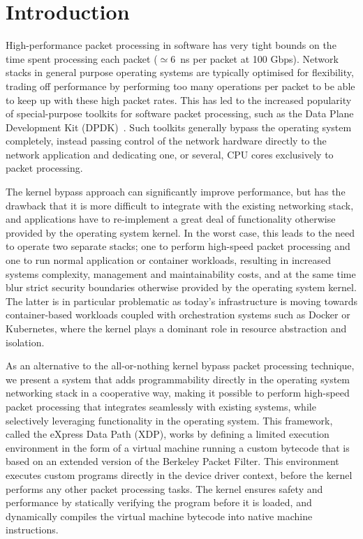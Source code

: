 \documentclass[10pt,sigconf,anonymous]{acmart}
\begin{document}

\maketitle

\section{Introduction}%
\label{sec:introduction}
High-performance packet processing in software has very tight bounds on the time
spent processing each packet ($\simeq6$~ns per packet at 100 Gbps). Network
stacks in general purpose operating systems are typically optimised for
flexibility, trading off performance by performing too many operations per
packet to be able to keep up with these high packet rates. This has led to the
increased popularity of special-purpose toolkits for software packet processing,
such as the Data Plane Development Kit (DPDK)~\cite{dpdk}. Such toolkits
generally bypass the operating system completely, instead passing control of the
network hardware directly to the network application and dedicating one, or
several, CPU cores exclusively to packet processing.

The kernel bypass approach can significantly improve performance, but has the
drawback that it is more difficult to integrate with the existing networking
stack, and applications have to re-implement a great deal of functionality
otherwise provided by the operating system kernel. In the worst case, this leads
to the need to operate two separate stacks; one to perform high-speed packet
processing and one to run normal application or container workloads, resulting
in increased systems complexity, management and maintainability costs, and at
the same time blur strict security boundaries otherwise provided by the
operating system kernel. The latter is in particular problematic as today's
infrastructure is moving towards container-based workloads coupled with
orchestration systems such as Docker or Kubernetes, where the kernel plays a
dominant role in resource abstraction and isolation.

As an alternative to the all-or-nothing kernel bypass packet processing
technique, we present a system that adds programmability directly in the
operating system networking stack in a cooperative way, making it possible to
perform high-speed packet processing that integrates seamlessly with existing
systems, while selectively leveraging functionality in the operating system.
This framework, called the eXpress Data Path (XDP), works by defining a limited
execution environment in the form of a virtual machine running a custom bytecode
that is based on an extended version of the Berkeley Packet Filter. This
environment executes custom programs directly in the device driver context,
before the kernel performs any other packet processing tasks. The kernel ensures
safety and performance by statically verifying the program before it is loaded,
and dynamically compiles the virtual machine bytecode into native machine
instructions.
\end{document}
